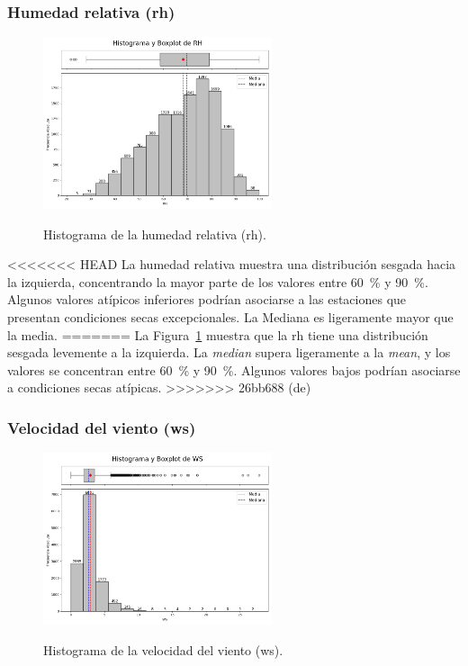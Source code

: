 \vspace{1.5em}

\subsubsection*{Humedad relativa (\gls{rh})}

\begin{figure}[htbp]
    \centering
    \caption{Histograma de la humedad relativa (\gls{rh}).}
    \includegraphics[width=0.6\textwidth]{resultados/global/univariado/RH_histograma.png}
    \label{fig:RH_histograma}
\end{figure}

<<<<<<< HEAD
La humedad relativa muestra una distribución sesgada hacia la izquierda, concentrando la mayor parte de los valores entre \SI{60}{\percent} y \SI{90}{\percent}. Algunos valores atípicos inferiores podrían asociarse a las estaciones que presentan condiciones secas excepcionales. La Mediana es ligeramente mayor que la media.
=======
La Figura~\ref{fig:RH_histograma} muestra que la \gls{rh} tiene una distribución sesgada levemente a la izquierda. La \textit{median} supera ligeramente a la \textit{mean}, y los valores se concentran entre \SI{60}{\percent} y \SI{90}{\percent}. Algunos valores bajos podrían asociarse a condiciones secas atípicas.
>>>>>>> 26bb688 (de)

\vspace{1.5em}

\subsubsection*{Velocidad del viento (\gls{ws})}

\begin{figure}[htbp]
    \centering
    \caption{Histograma de la velocidad del viento (\gls{ws}).}
    \includegraphics[width=0.6\textwidth]{resultados/global/univariado/WS_histograma.png}
    \label{fig:WS_histograma}
\end{figure}

